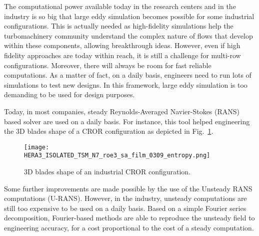 
The computational power available today in
the research centers and in the industry
is so big that large eddy simulation
becomes possible for some industrial configurations.
This is actually needed as high-fidelity
simulations help the turbomachinery community understand
the complex nature of flows that develop 
within these components,
allowing breakthrough ideas.
However, even if high fidelity approaches
are today within reach, it is still a challenge for
multi-row configurations.
Moreover, there will always be room for fast reliable
computations. 
As a matter of fact, on a daily basis, engineers need
to run lots of simulations to test new designs.
In this framework, large eddy simulation is
too demanding to be used for design purposes.

Today, in most companies, steady Reynolds-Averaged
Navier-Stokes (RANS) based solver are used on a daily basis.
For instance, this tool 
helped engineering the $3$D blades shape of a CROR
configuration as depicted in Fig.~\ref{fig:sm_leap}.
\begin{figure}[htbp]
  \centering
  \texttt{[image: HERA3\_ISOLATED\_TSM\_N7\_roe3\_sa\_film\_0309\_entropy.png]}
  \caption{$3$D blades shape of an industrial CROR configuration.}
  \label{fig:sm_leap}
\end{figure}
Some further improvements are made possible by the use
of the Unsteady RANS computations (U-RANS).
However, in the industry, unsteady computations
are still too expensive to be used on a daily basis.
Based on a simple Fourier series decomposition, Fourier-based methods are 
able to reproduce the unsteady field to engineering
accuracy, for a cost proportional to the cost of a
steady computation.

